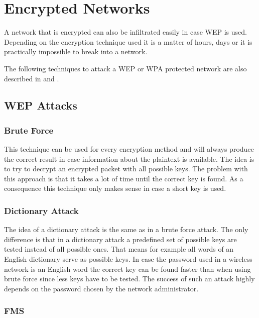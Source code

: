 \section{Encrypted Networks}

A network that is encrypted can also be infiltrated easily in case WEP is used. Depending on the encryption technique used it is a matter of hours, days or it is practically impossible to break into a network.

The following techniques to attack a WEP or WPA protected network are also described in \cite[p.60-62]{wlan_sicherheit} and \cite[p.130]{wlan_sicherheit}.

\subsection*{WEP Attacks}

\subsubsection{Brute Force}

This technique can be used for every encryption method and will always produce the correct result in case information about the plaintext is available. The idea is to try to decrypt an encrypted packet with all possible keys. The problem with this approach is that it takes a lot of time until the correct key is found. As a consequence this technique only makes sense in case a short key is used.

\subsubsection{Dictionary Attack}

The idea of a dictionary attack is the same as in a brute force attack. The only difference is that in a dictionary attack a predefined set of possible keys are tested instead of all possible ones. That means for example all words of an English dictionary serve as possible keys. In case the password used in a wireless network is an English word the correct key can be found faster than when using brute force since less keys have to be tested. The success of such an attack highly depends on the password chosen by the network administrator.

\subsubsection{FMS}

